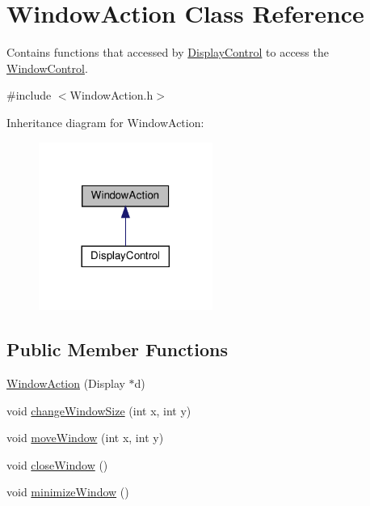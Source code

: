 \hypertarget{classWindowAction}{}\section{Window\+Action Class Reference}
\label{classWindowAction}


Contains functions that accessed by \hyperlink{classDisplayControl}{Display\+Control} to access the \hyperlink{classWindowControl}{Window\+Control}.  




{\ttfamily \#include $<$Window\+Action.\+h$>$}



Inheritance diagram for Window\+Action\+:\nopagebreak
\begin{figure}[H]
\begin{center}
\leavevmode
\includegraphics[width=161pt]{classWindowAction__inherit__graph}
\end{center}
\end{figure}
\subsection*{Public Member Functions}
\begin{DoxyCompactItemize}
\item 
\hyperlink{classWindowAction_a1836cf300ad545fa88f33454d09765e1}{Window\+Action} (Display $\ast$d)
\item 
void \hyperlink{classWindowAction_ac7145d79c3b902a716d554d09e6e2a63}{change\+Window\+Size} (int x, int y)
\item 
void \hyperlink{classWindowAction_ae79c374bbbc84ff3dfb8565ede5f4220}{move\+Window} (int x, int y)
\item 
void \hyperlink{classWindowAction_a99150ce49f2956c56e64b6ba0246424f}{close\+Window} ()
\item 
void \hyperlink{classWindowAction_aa6f2b2543505c0c44027b501f151d4bf}{minimize\+Window} ()
\end{DoxyCompactItemize}


